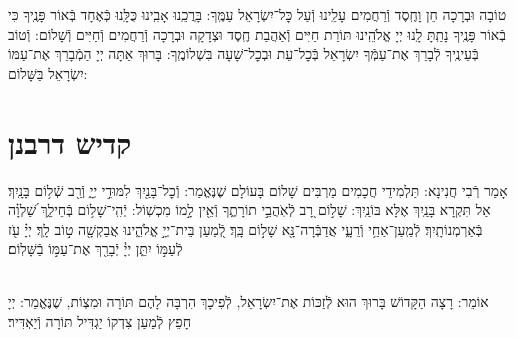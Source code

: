 \documentclass[twoside, openany, parskip=half, 11pt]{book}
\begin{document}
טוֹבָה וּבְרָכָה חֵן וָחֶֽסֶד וְֿרַחֲמִים עָלֵֽינוּ וְֿעַל כׇּל־יִשְׂרָאֵל עַמֶּֽךָ: בָּרֲכֵֽנוּ אָבִֽינוּ כֻּלָּֽנוּ כְּֿאֶחָד בְּֿאוֹר פָּנֶֽיךָ כִּי בְֿאוֹר פָּנֶֽיךָ נָתַֽתָּ לָֽנוּ יְיָ אֱלֹהֵֽינוּ תּוֹרַת חַיִּים וְֿאַהֲבַת חֶֽסֶד וּצְדָקָה וּבְרָכָה וְֿרַחֲמִים וְֿחַיִּים וְֿשָׁלוֹם: וְֿטוֹב בְּֿעֵינֶֽיךָ לְֿבָרֵךְ אֶת־עַמְּֿךָ יִשְׂרָאֵל בְּֿכׇל־עֵת וּבְכׇל־שָׁעָה בִּשְׁלוֹמֶֽךָ: בָּרוּךְ אַתָּה יְיָ הַמְֿבָרֵךְ אֶת־עַמּוֹ יִשְׂרָאֵל בַּשָּׁלוֹם:

\tachanunim

\vfill


\sepline


\chapter[קדיש דרבנן]{ קדיש דרבנן }
\label{kaddish derabonan}


אָמַר רְֿבִי חֲנִינָא: תַּלְמִידֵי חֲכָמִים מַרְבִּים שָׁלוֹם בָּעוֹלָם שֶׁנֶּאֱמַר: וְֿכׇל־בָּנַ֖יִךְ לִמּוּדֵ֣י יְיָ֑ וְֿרַ֖ב שְֿׁל֥וֹם בָּנָֽיִךְ׃ אַל תִּקְרָא בָּנַֽיִךְ אֶלָּא בּוֹנַֽיִךְ: שָׁל֣וֹם רָ֭ב לְֿאֹֽהֲבֵ֣י תוֹרָתֶ֑ךָ וְֿאֵ֖ין לָ֣מוֹ מִכְשֽׁוֹל: יְֿהִֽי־שָׁל֥וֹם בְּֿחֵילֵ֑ךְ שַׁ֝לְוָ֗ה בְּֿאַרְמְנוֹתָֽיִךְ׃ לְֿמַֽעַן־אַחַ֥י וְֿרֵעָ֑י אֲדַבְּֿרָה־נָּ֖א שָׁל֣וֹם בָּֽךְ׃ לְֿ֭מַעַן בֵּית־יְיָ֣ אֱלֹהֵ֑ינוּ אֲבַקְשָׁ֖ה ט֣וֹב לָֽךְ׃ יְיָ֗ עֹ֖ז לְֿעַמּ֣וֹ יִתֵּ֑ן יְיָ֓ יְֿבָרֵ֖ךְ אֶת־עַמּ֣וֹ בַֿשָּׁלֽוֹם׃

\\
אוֹמֵר: רָצָה הַקָּדוֹשׁ בָּרוּךְ הוּא לְֿזַכּוֹת אֶת־יִשְׂרָאֵל, לְֿפִיכָךְ הִרְבָּה לָהֶם תּוֹרָה וּמִצְוֹת, שֶׁנֶּאֱמַר:
יְיָ חָפֵץ לְֿמַעַן צִדְקוֹ יַגְדִּיל תּוֹרָה וְֿיַאְדִּיר׃
\end{document}
